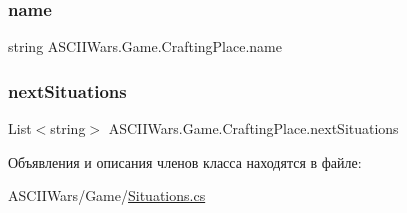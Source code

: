 \subsubsection{\texorpdfstring{name}{name}}
{\footnotesize\ttfamily string A\+S\+C\+I\+I\+Wars.\+Game.\+Crafting\+Place.\+name}

\hypertarget{class_a_s_c_i_i_wars_1_1_game_1_1_crafting_place_a29294bd0619212b716e258dce38c89dc}{}\label{class_a_s_c_i_i_wars_1_1_game_1_1_crafting_place_a29294bd0619212b716e258dce38c89dc} 
\subsubsection{\texorpdfstring{next\+Situations}{nextSituations}}
{\footnotesize\ttfamily List$<$string$>$ A\+S\+C\+I\+I\+Wars.\+Game.\+Crafting\+Place.\+next\+Situations}



Объявления и описания членов класса находятся в файле\+:\begin{DoxyCompactItemize}
\item 
A\+S\+C\+I\+I\+Wars/\+Game/\hyperlink{_situations_8cs}{Situations.\+cs}\end{DoxyCompactItemize}
